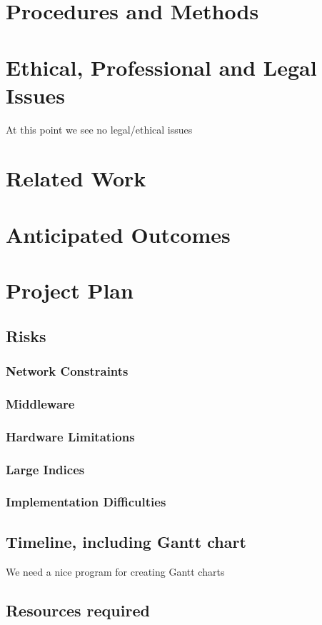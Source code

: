 \documentclass[12pt,a4paper]{article}
\begin{document}
\section{Procedures and Methods}
\section{Ethical, Professional and Legal Issues}
At this point we see no legal/ethical issues
\section{Related Work}
\section{Anticipated Outcomes}
\section{Project Plan}
\subsection{Risks}
\subsubsection*{Network Constraints}
\subsubsection*{Middleware}
\subsubsection*{Hardware Limitations}
\subsubsection*{Large Indices}
\subsubsection*{Implementation Difficulties}
\subsection{Timeline, including Gantt chart}
We need a nice program for creating Gantt charts
\subsection{Resources required}
\end{document}
